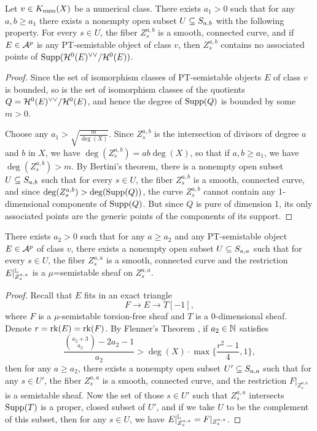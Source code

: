 \begin{lem}\label{nocomponent}
    Let $v \in K_{\mathrm{num}}(X)$ be a numerical class. There exists $a_1 > 0$ such that for any $a, b \ge a_1$ there exists a nonempty open subset $U \subseteq S_{a,b}$ with the following property. For every $s \in U$, the fiber $Z^{a,b}_s$ is a smooth, connected curve, and if $E \in \mathcal{A}^p$ is any PT-semistable object of class $v$, then $Z^{a,b}_s$ contains no associated points of $\operatorname{\mathrm{Supp}}(\mathcal{H}^0(E)^{\vee\vee}/\mathcal{H}^0(E))$.
\end{lem}
\begin{proof}
    Since the set of isomorphism classes of PT-semistable objects $E$ of class $v$ is bounded, so is the set of isomorphism classes of the quotients $Q = \mathcal{H}^0(E)^{\vee\vee}/\mathcal{H}^0(E)$, and hence the degree of $\operatorname{\mathrm{Supp}}(Q)$ is bounded by some $m > 0$. 
    
    Choose any $a_1 > \sqrt{\frac{m}{\deg(X)}}$. Since $Z^{a,b}_s$ is the intersection of divisors of degree $a$ and $b$ in $X$, we have $\deg(Z^{a,b}_s) = a b \deg(X)$, so that if $a, b \ge a_1$, we have $\deg(Z^{a,b}_s) > m$. By Bertini's theorem, there is a nonempty open subset $U \subseteq S_{a,b}$ such that for every $s \in U$, the fiber $Z^{a,b}_s$ is a smooth, connected curve, and since $\deg(Z^{a,b}_s) > \deg(\operatorname{\mathrm{Supp}}(Q))$, the curve $Z^{a,b}_s$ cannot contain any 1-dimensional components of $\operatorname{\mathrm{Supp}}(Q)$. But since $Q$ is pure of dimension 1, its only associated points are the generic points of the components of its support.
\end{proof}

\begin{lem}\label{flenner-PT}
    There exists $a_2 > 0$ such that for any $a \ge a_2$ and any PT-semistable object $E \in \mathcal{A}^p$ of class $v$, there exists a nonempty open subset $U \subseteq S_{a,a}$ such that for every $s \in U$, the fiber $Z^{a,a}_s$ is a smooth, connected curve and the restriction $E|^{\mathbb{L}}_{Z^{a,a}_s}$ is a $\mu$=semistable sheaf on $Z^{a,a}_s$.
\end{lem}
\begin{proof}
    Recall that $E$ fits in an exact triangle
    \[ F \to E \to T[-1], \]
    where $F$ is a $\mu$-semistable torsion-free sheaf and $T$ is a 0-dimensional sheaf. Denote $r = \operatorname{\mathrm{rk}}(E) = \operatorname{\mathrm{rk}}(F)$. By Flenner's Theorem \cite[Theorem 7.1.1]{HL}, if $a_2 \in \mathbb{N}$ satisfies
    \[ \frac{\binom{a_2+3}{a_2} - 2 a_2 - 1}{a_2} > \deg(X)\cdot \max\{\frac{r^2 - 1}{4}, 1\}, \]
    then for any $a \ge a_2$, there exists a nonempty open subset $U' \subseteq S_{a,a}$ such that for any $s \in U'$, the fiber $Z^{a,a}_s$ is a smooth, connected curve, and the restriction $F|_{Z^{a,a}_s}$ is a semistable sheaf. Now the set of those $s \in U'$ such that $Z^{a,a}_s$ intersects $\operatorname{\mathrm{Supp}}(T)$ is a proper, closed subset of $U'$, and if we take $U$ to be the complement of this subset, then for any $s \in U$, we have $E|^{\mathbb{L}}_{Z^{a,a}_s} = F|_{Z^{a,a}_s}$.
\end{proof}

